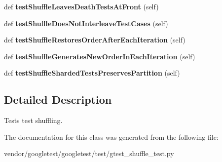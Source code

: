 \begin{DoxyCompactItemize}
\item 
def {\bfseries test\+Shuffle\+Leaves\+Death\+Tests\+At\+Front} (self)\hypertarget{classgtest__shuffle__test_1_1GTestShuffleUnitTest_a6fa91b262595e35bd3e9b52e188dc634}{}\label{classgtest__shuffle__test_1_1GTestShuffleUnitTest_a6fa91b262595e35bd3e9b52e188dc634}

\item 
def {\bfseries test\+Shuffle\+Does\+Not\+Interleave\+Test\+Cases} (self)\hypertarget{classgtest__shuffle__test_1_1GTestShuffleUnitTest_a34bfc9696191f4c2782327e1e35ae902}{}\label{classgtest__shuffle__test_1_1GTestShuffleUnitTest_a34bfc9696191f4c2782327e1e35ae902}

\item 
def {\bfseries test\+Shuffle\+Restores\+Order\+After\+Each\+Iteration} (self)\hypertarget{classgtest__shuffle__test_1_1GTestShuffleUnitTest_a77b83a9870ad8d68524e1177f5320fb0}{}\label{classgtest__shuffle__test_1_1GTestShuffleUnitTest_a77b83a9870ad8d68524e1177f5320fb0}

\item 
def {\bfseries test\+Shuffle\+Generates\+New\+Order\+In\+Each\+Iteration} (self)\hypertarget{classgtest__shuffle__test_1_1GTestShuffleUnitTest_ada78bae27e0d82d07bd663d53a36552b}{}\label{classgtest__shuffle__test_1_1GTestShuffleUnitTest_ada78bae27e0d82d07bd663d53a36552b}

\item 
def {\bfseries test\+Shuffle\+Sharded\+Tests\+Preserves\+Partition} (self)\hypertarget{classgtest__shuffle__test_1_1GTestShuffleUnitTest_abd33c5ef01ce6d1d025ebcc816d47c19}{}\label{classgtest__shuffle__test_1_1GTestShuffleUnitTest_abd33c5ef01ce6d1d025ebcc816d47c19}

\end{DoxyCompactItemize}


\subsection{Detailed Description}
\begin{DoxyVerb}Tests test shuffling.\end{DoxyVerb}
 

The documentation for this class was generated from the following file\+:\begin{DoxyCompactItemize}
\item 
vendor/googletest/googletest/test/gtest\+\_\+shuffle\+\_\+test.\+py\end{DoxyCompactItemize}
